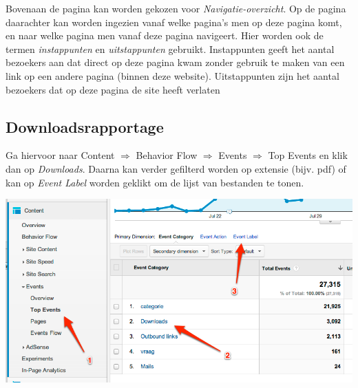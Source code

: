 Bovenaan de pagina kan worden gekozen voor \emph{Navigatie-overzicht}. Op de pagina daarachter kan worden ingezien vanaf welke pagina's men op deze pagina komt, en naar welke pagina men vanaf deze pagina navigeert. Hier worden ook de termen \emph{instappunten} en \emph{uitstappunten} gebruikt. Instappunten geeft het aantal bezoekers aan dat direct op deze pagina kwam zonder gebruik te maken van een link op een andere pagina (binnen deze website). Uitstappunten zijn het aantal bezoekers dat op deze pagina de site heeft verlaten
\\

\subsection{Downloadsrapportage}
Ga hiervoor naar Content $\Rightarrow$ Behavior Flow $\Rightarrow$ Events $\Rightarrow$ Top Events en klik dan op \emph{Downloads}. Daarna kan verder gefilterd worden op extensie (bijv. pdf) of kan op \emph{Event Label} worden geklikt om de lijst van bestanden te tonen.

\includegraphics[width=\textwidth]{img/statsgadownloads.png}
